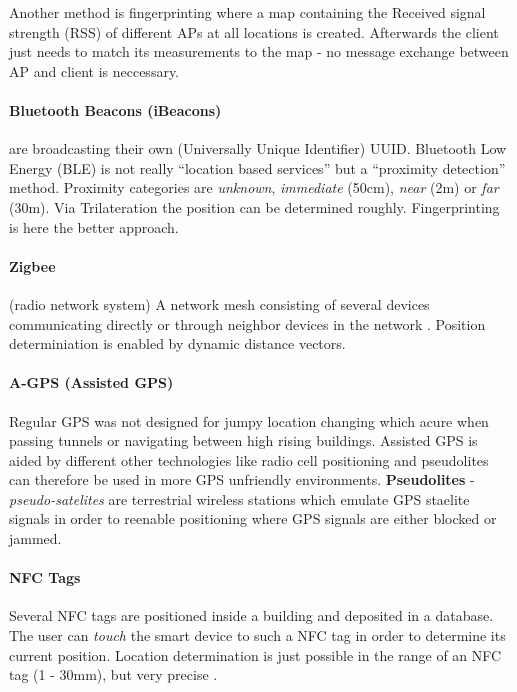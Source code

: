 Another method is fingerprinting where a map containing the Received signal strength (RSS) of different APs at all locations is created. Afterwards the client just needs to match its measurements to the map - no message exchange between AP and client is neccessary.


\paragraph{Bluetooth Beacons (iBeacons)} are broadcasting their own (Universally Unique Identifier) UUID. Bluetooth Low Energy (BLE) is not really “location based services” but a “proximity detection” method. Proximity categories are \textit{unknown}, \textit{immediate} (50cm), \textit{near} (2m) or \textit{far} (30m). Via Trilateration the position can be determined roughly. Fingerprinting is here the better approach.


\paragraph{Zigbee} (radio network system) A network mesh consisting of several devices communicating directly or through neighbor devices in the network \parencite{zigbee1}. Position determiniation is enabled by dynamic distance vectors. 

\paragraph{A-GPS (Assisted GPS)} Regular GPS was not designed for jumpy location changing which acure when passing tunnels or navigating between high rising buildings. Assisted GPS is aided by different other technologies like radio cell positioning and pseudolites can therefore be used in more GPS unfriendly environments. \textbf{Pseudolites} - \textit{pseudo-satelites} are terrestrial wireless stations which emulate GPS staelite signals in order to reenable positioning where GPS signals are either blocked or jammed.


\paragraph{NFC Tags} Several NFC tags are positioned inside a building and deposited in a database. The user can \textit{touch} the smart device to such a NFC tag in order to determine its current position. Location determination is just possible in the range of an NFC tag (1 - 30mm), but very precise \parencite{nfc1}. 
 

